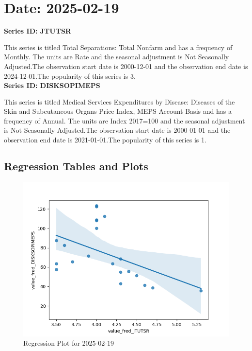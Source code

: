 \section{Date: 2025-02-19}
\noindent \textbf{Series ID: JTUTSR} 

\noindent This series is titled Total Separations: Total Nonfarm and has a frequency of Monthly. The units are Rate and the seasonal adjustment is Not Seasonally Adjusted.The observation start date is 2000-12-01 and the observation end date is 2024-12-01.The popularity of this series is 3. \\ 

\noindent \textbf{Series ID: DISKSOPIMEPS} 

\noindent This series is titled Medical Services Expenditures by Disease: Diseases of the Skin and Subcutaneous Organs Price Index, MEPS Account Basis and has a frequency of Annual. The units are Index 2017=100 and the seasonal adjustment is Not Seasonally Adjusted.The observation start date is 2000-01-01 and the observation end date is 2021-01-01.The popularity of this series is 1. \\ 

\subsection{Regression Tables and Plots}


\begin{figure}
\centering
\includegraphics[scale = 0.9]{plots/plot_2025-02-19.png}
\caption{Regression Plot for 2025-02-19}
\end{figure}
\newpage
